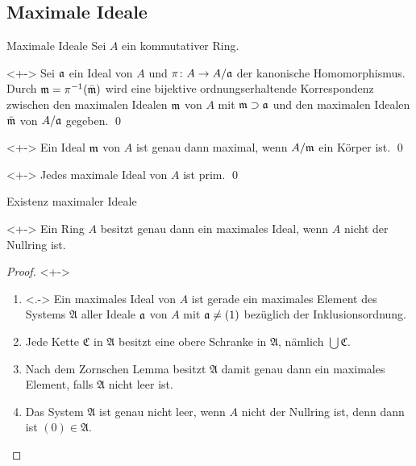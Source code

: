 \subsection{Maximale Ideale}

\begin{frame}{Maximale Ideale}
    Sei \(A\) ein kommutativer Ring.
    \begin{proposition}<+->
        Sei \(\mathfrak{a}\) ein Ideal von \(A\) und \(\pi\colon A \to A/\mathfrak{a}\) der
        kanonische Homomorphismus.
        Durch \(\mathfrak{m} = \pi^{-1}(\bar{\mathfrak{m}})\) wird eine bijektive 
        ordnungserhaltende Korrespondenz zwischen den maximalen Idealen \(\mathfrak{m}\)
        von \(A\) mit \(\mathfrak{m} \supset \mathfrak{a}\) und den maximalen Idealen
        \(\bar{\mathfrak{m}}\) von \(A/\mathfrak{a}\) gegeben.
        \qed
    \end{proposition}
    \begin{proposition}<+->
        Ein Ideal \(\mathfrak{m}\) von \(A\) ist genau dann maximal, wenn
        \(A/\mathfrak{m}\) ein Körper ist.
        \qed
    \end{proposition}
    \begin{corollary}<+->
        Jedes maximale Ideal von \(A\) ist prim.
        \qed
    \end{corollary}
\end{frame}

\begin{frame}{Existenz maximaler Ideale}
    \begin{theorem}<+->
        Ein Ring \(A\) besitzt genau dann ein maximales Ideal, wenn \(A\) nicht der
        Nullring ist.
    \end{theorem}
    \begin{proof}<+->
        \begin{enumerate}[<+->]
        \item<.->
            Ein maximales Ideal von \(A\) ist gerade ein maximales Element des
            Systems \(\mathfrak A\) aller Ideale \(\mathfrak{a}\) von \(A\) mit
            \(\mathfrak{a} \neq (1)\) bezüglich der Inklusionsordnung.
        \item
            Jede Kette \(\mathfrak C\) in \(\mathfrak A\) besitzt eine obere Schranke
            in \(\mathfrak A\), nämlich \(\bigcup \mathfrak C\).
        \item
            Nach dem Zornschen Lemma besitzt \(\mathfrak A\) damit genau dann ein
            maximales Element, falls \(\mathfrak A\) nicht leer ist.
        \item
            Das System \(\mathfrak A\) ist genau nicht leer, wenn \(A\) nicht der
            Nullring ist, denn dann ist \((0) \in \mathfrak A\).
            \qedhere
        \end{enumerate}
    \end{proof}
\end{frame}

